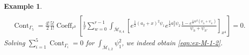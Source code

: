 \documentclass[12pt,reqno]{amsart}
\DeclareMathOperator{\Cont}{Cont}
\DeclareMathOperator{\Coeff}{Coeff}
\theoremstyle{plain}
\newtheorem{example}[theorem]{Example}
\theoremstyle{definition}
\theoremstyle{remark}
\newcommand{\Xin}[1]{{\color{magenta}{\texttt Xin: #1}}}
\begin{document}
\begin{example}
\begin{align*}
\\&
\Cont_{\Gamma_5}=\frac{4!}{2}\frac{5!}{1!}\Coeff_{r^0}\left[\frac{1}{r}\sum_{w=0}^{r-1}\int_{\overline{\mathcal{M}}_{0,4}}\left[e^{\frac{1}{2}(a_2+x)^2\psi_1}e^{\frac{1}{2}a_2^2\psi_2}\frac{1-e^{\frac{1}{2}w^2(\psi_{h}+\psi_{h'})}}{\psi_{h}+\psi_{h'}}\right]_{x^4}\right]=0.
\end{align*}
Solving $\sum_{i = 1}^5 \Cont_{\Gamma_i} = 0$ for $\int_{\overline{\mathcal{M}}_{1,2}} \psi_1^2$, we indeed obtain \eqref{eqn:ex-M-1-2}.

\end{example}
\end{document}
